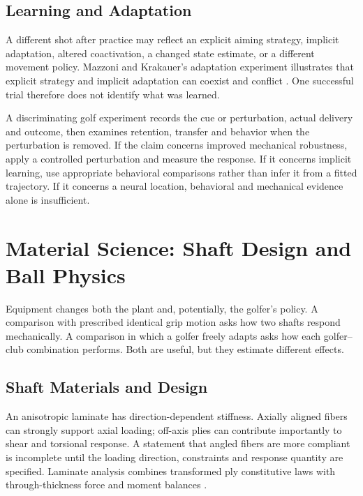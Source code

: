 \subsection{Learning and Adaptation}

A different shot after practice may reflect an explicit aiming strategy, implicit adaptation, altered coactivation, a changed state estimate, or a different movement policy. Mazzoni and Krakauer's adaptation experiment illustrates that explicit strategy and implicit adaptation can coexist and conflict \citep{Mazzoni2006Strategy}. One successful trial therefore does not identify what was learned.

A discriminating golf experiment records the cue or perturbation, actual delivery and outcome, then examines retention, transfer and behavior when the perturbation is removed. If the claim concerns improved mechanical robustness, apply a controlled perturbation and measure the response. If it concerns implicit learning, use appropriate behavioral comparisons rather than infer it from a fitted trajectory. If it concerns a neural location, behavioral and mechanical evidence alone is insufficient.

\section{Material Science: Shaft Design and Ball Physics}

Equipment changes both the plant and, potentially, the golfer's policy. A comparison with prescribed identical grip motion asks how two shafts respond mechanically. A comparison in which a golfer freely adapts asks how each golfer--club combination performs. Both are useful, but they estimate different effects.

\subsection{Shaft Materials and Design}

An anisotropic laminate has direction-dependent stiffness. Axially aligned fibers can strongly support axial loading; off-axis plies can contribute importantly to shear and torsional response. A statement that angled fibers are more compliant is incomplete until the loading direction, constraints and response quantity are specified. Laminate analysis combines transformed ply constitutive laws with through-thickness force and moment balances \citep{Roylance2000Laminates}.

